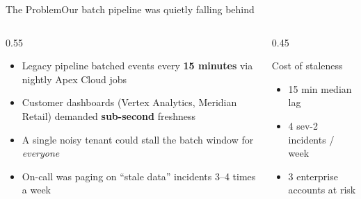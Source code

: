 \documentclass[aspectratio=169,10pt]{beamer}
\begin{document}
\begin{frame}{The Problem}{Our batch pipeline was quietly falling behind}
  \begin{columns}[T,onlytextwidth]
    \begin{column}{0.55\textwidth}
      \begin{itemize}
        \item Legacy pipeline batched events every \textbf{15 minutes} via nightly
          Apex Cloud jobs
        \item Customer dashboards (Vertex Analytics, Meridian Retail) demanded
          \textbf{sub-second} freshness
        \item A single noisy tenant could stall the batch window for
          \emph{everyone}
        \item On-call was paging on ``stale data'' incidents 3--4 times a week
      \end{itemize}
    \end{column}
    \begin{column}{0.45\textwidth}
      \begin{statbox}{Cost of staleness}
        \begin{itemize}
          \item[\faClock] 15 min median lag
          \item[\faBolt] 4 sev-2 incidents / week
          \item[\faUsers] 3 enterprise accounts at risk
        \end{itemize}
      \end{statbox}
    \end{column}
  \end{columns}
\end{frame}
\end{document}

